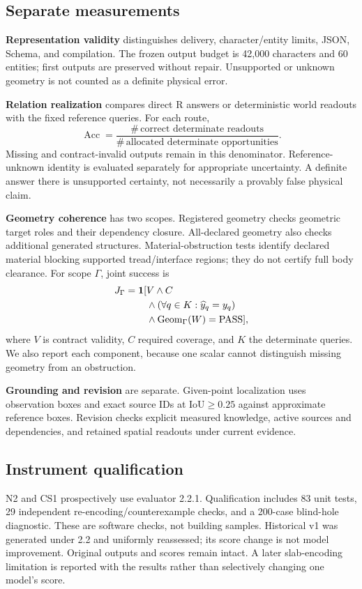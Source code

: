 \subsection{Separate measurements}
\textbf{Representation validity} distinguishes delivery, character/entity
limits, JSON, Schema, and compilation. The frozen output budget is
42,000 characters and 60 entities; first outputs are preserved without
repair. Unsupported or unknown geometry is not counted as a definite
physical error.

\textbf{Relation realization} compares direct R answers or deterministic
world readouts with the fixed reference queries. For each route,
\begin{equation}
\operatorname{Acc} =
\frac{\#\,\text{correct determinate readouts}}
     {\#\,\text{allocated determinate opportunities}}.
\end{equation}
Missing and contract-invalid outputs remain in this denominator.
Reference-unknown identity is evaluated separately for appropriate
uncertainty. A definite answer there is unsupported certainty, not
necessarily a provably false physical claim.

\textbf{Geometry coherence} has two scopes. Registered geometry checks
geometric target roles and their dependency closure. All-declared geometry also
checks additional generated structures. Material-obstruction tests
identify declared material blocking supported tread/interface regions;
they do not certify full body clearance. For scope $\Gamma$, joint success is
\begin{equation}
\label{eq:joint}
\begin{aligned}
J_\Gamma=\mathbf 1[&V\land C\\
 &\land(\forall q\in K:\widehat y_q=y_q)\\
 &\land\mathrm{Geom}_\Gamma(W)=\mathrm{PASS}],
\end{aligned}
\end{equation}
where $V$ is contract validity, $C$ required coverage, and $K$ the
determinate queries. We also report each component, because one scalar
cannot distinguish missing geometry from an obstruction.

\textbf{Grounding and revision} are separate. Given-point localization
uses observation boxes and exact source IDs at IoU$\geq0.25$ against
approximate reference boxes. Revision checks explicit measured knowledge,
active sources and dependencies, and retained spatial readouts under
current evidence.

\subsection{Instrument qualification}
N2 and CS1 prospectively use evaluator 2.2.1. Qualification includes 83
unit tests, 29 independent re-encoding/counterexample checks, and a
200-case blind-hole diagnostic. These are software checks, not building
samples. Historical v1 was generated under 2.2 and uniformly reassessed;
its score change is not model improvement. Original outputs and scores
remain intact. A later slab-encoding limitation is reported with the
results rather than selectively changing one model's score.
